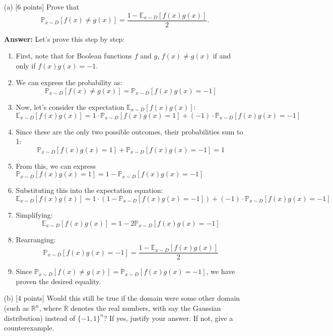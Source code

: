 \documentclass{article}
\begin{document}
\begin{enumerate}
    \item [(a)] [6 points] Prove that
    \[
    \mathbb{P}_{x\sim D}[f(x) \neq g(x)] = \frac{1 - \mathbb{E}_{x\sim D}[f(x)g(x)]}{2}.
    \]
    
    \textbf{Answer:}
    Let's prove this step by step:
    \begin{enumerate}
        \item First, note that for Boolean functions $f$ and $g$, $f(x) \neq g(x)$ if and only if $f(x)g(x) = -1$.
        \item We can express the probability as:
        \[
        \mathbb{P}_{x\sim D}[f(x) \neq g(x)] = \mathbb{P}_{x\sim D}[f(x)g(x) = -1]
        \]
        \item Now, let's consider the expectation $\mathbb{E}_{x\sim D}[f(x)g(x)]$:
        \[
        \mathbb{E}_{x\sim D}[f(x)g(x)] = 1 \cdot \mathbb{P}_{x\sim D}[f(x)g(x) = 1] + (-1) \cdot \mathbb{P}_{x\sim D}[f(x)g(x) = -1]
        \]
        \item Since these are the only two possible outcomes, their probabilities sum to 1:
        \[
        \mathbb{P}_{x\sim D}[f(x)g(x) = 1] + \mathbb{P}_{x\sim D}[f(x)g(x) = -1] = 1
        \]
        \item From this, we can express $\mathbb{P}_{x\sim D}[f(x)g(x) = 1] = 1 - \mathbb{P}_{x\sim D}[f(x)g(x) = -1]$
        \item Substituting this into the expectation equation:
        \[
        \mathbb{E}_{x\sim D}[f(x)g(x)] = 1 \cdot (1 - \mathbb{P}_{x\sim D}[f(x)g(x) = -1]) + (-1) \cdot \mathbb{P}_{x\sim D}[f(x)g(x) = -1]
        \]
        \item Simplifying:
        \[
        \mathbb{E}_{x\sim D}[f(x)g(x)] = 1 - 2\mathbb{P}_{x\sim D}[f(x)g(x) = -1]
        \]
        \item Rearranging:
        \[
        \mathbb{P}_{x\sim D}[f(x)g(x) = -1] = \frac{1 - \mathbb{E}_{x\sim D}[f(x)g(x)]}{2}
        \]
        \item Since $\mathbb{P}_{x\sim D}[f(x) \neq g(x)] = \mathbb{P}_{x\sim D}[f(x)g(x) = -1]$, we have proven the desired equality.
    \end{enumerate}
    
    \item [(b)] [4 points] Would this still be true if the domain were some other domain (such as $\mathbb{R}^n$, where $\mathbb{R}$ denotes the real numbers, with say the Gaussian distribution) instead of $\{-1,1\}^n$? If yes, justify your answer. If not, give a counterexample.
    

\end{enumerate}
\end{document}
